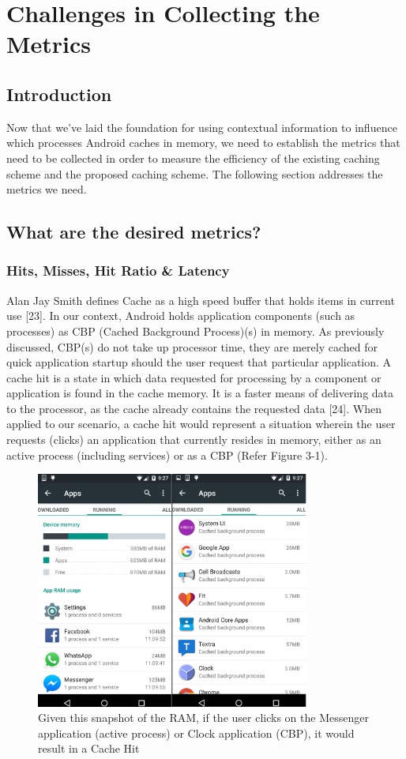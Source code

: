 \documentclass[12pt]{uthesis-v12}  %
\begin{document}
\chapter{Challenges in Collecting the Metrics}
	
	\section{Introduction}
		Now that we've laid the foundation for using contextual information to influence which processes Android caches in memory, we need to establish the metrics that need to be collected in order to measure the efficiency of the existing caching scheme and the proposed caching scheme. The following section addresses the metrics we need.
	
	\section{What are the desired metrics?}
		
		\subsection{Hits, Misses, Hit Ratio \& Latency}
			Alan Jay Smith defines Cache as a high speed buffer that holds items in current use [23]. In our context, Android holds application components (such as processes) as CBP (Cached Background Process)(s) in memory. As previously discussed, CBP(s) do not take up processor time, they are merely cached for quick application startup should the user request that particular application. A cache hit is a state in which data requested for processing by a component or application is found in the cache memory. It is a faster means of delivering data to the processor, as the cache already contains the requested data [24]. When applied to our scenario, a cache hit would represent a situation wherein the user requests (clicks) an application that currently resides in memory, either as an active process (including services) or as a CBP (Refer Figure 3-1).  
			
			\begin{figure}[!ht]
				\centering
				\includegraphics[width = 90mm]{images/runningApps.png}
				\caption[Running Apps and CBP(s) - Cache Hit]
				{Given this snapshot of the RAM, if the user clicks on the Messenger application (active process) or Clock application (CBP), it would result in a Cache Hit}
			\end{figure}
			
\end{document}
